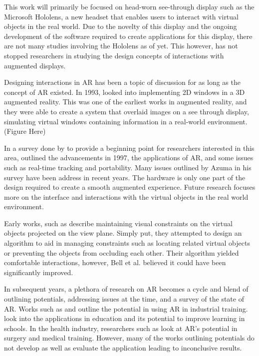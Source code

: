 This work will primarily be focused on head-worn see-through display such as the Microsoft Hololens, a new headset that enables users to interact with virtual objects in the real world. Due to the novelty of this display and the ongoing development of the software required to create applications for this display, there are not many studies involving the Hololens as of yet. This however, has not stopped researchers in studying the design concepts of interactions with augmented displays. 

Designing interactions in AR has been a topic of discussion for as long as the concept of AR existed. In 1993, \cite{Feiner1993} looked into implementing 2D windows in a 3D augmented reality. This was one of the earliest works in augmented reality, and they were able to create a system that overlaid images on a see through display, simulating virtual windows containing information in a real-world environment. (Figure Here)

In a survey done by \cite{Azuma1997} to provide a beginning point for researchers interested in this area, outlined the advancements in 1997, the applications of AR, and some issues such as real-time tracking and portability. Many issues outlined by Azuma in his survey have been address in recent years. The hardware is only one part of the design required to create a smooth augmented experience. Future research focuses more on the interface and interactions with the virtual objects in the real world environment.

Early works, such as \cite{Bell2001} describe maintaining visual constraints on the virtual objects projected on the view plane. Simply put, they attempted to design an algorithm to aid in managing constraints such as locating related virtual objects or preventing the objects from occluding each other. Their algorithm yielded comfortable interactions, however, Bell et al. believed it could have been significantly improved. 

In subsequent years, a plethora of research on AR becomes a cycle and blend of outlining potentials, addressing issues at the time, and a survey of the state of AR. Works such as \cite{Zhong2003} and \cite{Boulanger2004} outline the potential in using AR in industrial training. \cite{Bower2014} look into the applications in education and its potential to improve learning in schools. In the health industry, researchers such as \cite{Barsom2016, Chan2017, Chen2015, Okamoto2015} look at AR's potential in surgery and medical training. However, many of the works outlining potentials do not develop as well as evaluate the application leading to inconclusive results.

